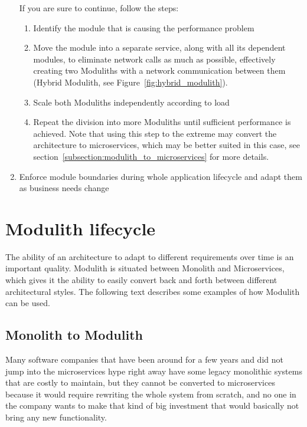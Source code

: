 \begin{enumerate}
          If you are sure to continue, follow the steps:
          \begin{enumerate}
              \item Identify the module that is causing the performance problem
              \item Move the module into a separate service, along with all its dependent modules, to eliminate network calls as much as possible, effectively creating two Moduliths with a network communication between them (Hybrid Modulith, see Figure~\ref{fig:hybrid_modulith}).
              \item Scale both Moduliths independently according to load
              \item Repeat the division into more Moduliths until sufficient performance is achieved. Note that using this step to the extreme may convert the architecture to microservices, which may be better suited in this case, see section~\ref{subsection:modulith_to_microservices} for more details.
          \end{enumerate}
    \item Enforce module boundaries during whole application lifecycle and adapt them as business needs change
\end{enumerate}


\section{Modulith lifecycle}
The ability of an architecture to adapt to different requirements over time is an important quality. Modulith is situated between Monolith and Microservices, which gives it the ability to easily convert back and forth between different architectural styles. The following text describes some examples of how Modulith can be used.

\subsection{Monolith to Modulith}
\label{subsection:monolith_to_modulith}
Many software companies that have been around for a few years and did not jump into the microservices hype right away have some legacy monolithic systems that are costly to maintain, but they cannot be converted to microservices because it would require rewriting the whole system from scratch, and no one in the company wants to make that kind of big investment that would basically not bring any new functionality.

